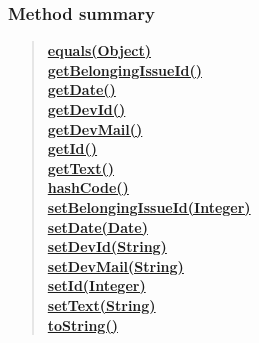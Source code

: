 {{\subsubsection{Method summary}{
\begin{verse}
\hyperlink{it.unisa.sesa.repominer.db.entities.IssueComment.equals(java.lang.Object)}{{\bf equals(Object)}} \\
\hyperlink{it.unisa.sesa.repominer.db.entities.IssueComment.getBelongingIssueId()}{{\bf getBelongingIssueId()}} \\
\hyperlink{it.unisa.sesa.repominer.db.entities.IssueComment.getDate()}{{\bf getDate()}} \\
\hyperlink{it.unisa.sesa.repominer.db.entities.IssueComment.getDevId()}{{\bf getDevId()}} \\
\hyperlink{it.unisa.sesa.repominer.db.entities.IssueComment.getDevMail()}{{\bf getDevMail()}} \\
\hyperlink{it.unisa.sesa.repominer.db.entities.IssueComment.getId()}{{\bf getId()}} \\
\hyperlink{it.unisa.sesa.repominer.db.entities.IssueComment.getText()}{{\bf getText()}} \\
\hyperlink{it.unisa.sesa.repominer.db.entities.IssueComment.hashCode()}{{\bf hashCode()}} \\
\hyperlink{it.unisa.sesa.repominer.db.entities.IssueComment.setBelongingIssueId(java.lang.Integer)}{{\bf setBelongingIssueId(Integer)}} \\
\hyperlink{it.unisa.sesa.repominer.db.entities.IssueComment.setDate(java.util.Date)}{{\bf setDate(Date)}} \\
\hyperlink{it.unisa.sesa.repominer.db.entities.IssueComment.setDevId(java.lang.String)}{{\bf setDevId(String)}} \\
\hyperlink{it.unisa.sesa.repominer.db.entities.IssueComment.setDevMail(java.lang.String)}{{\bf setDevMail(String)}} \\
\hyperlink{it.unisa.sesa.repominer.db.entities.IssueComment.setId(java.lang.Integer)}{{\bf setId(Integer)}} \\
\hyperlink{it.unisa.sesa.repominer.db.entities.IssueComment.setText(java.lang.String)}{{\bf setText(String)}} \\
\hyperlink{it.unisa.sesa.repominer.db.entities.IssueComment.toString()}{{\bf toString()}} \\
\end{verse}
}
}}
